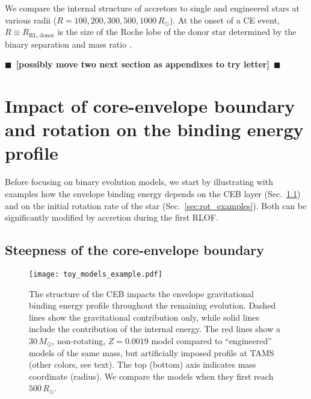 \documentclass[twocolumn,twocolappendix,trackchanges]{aastex63}
\DeclareRobustCommand{\Secref}[1]{Sec.~\ref{#1}}
\newcommand{\todo}[1]{{\large $\blacksquare$~\textbf{\color{red}[#1]}}~$\blacksquare$}
\begin{document}
We compare the internal structure of accretors to single and
engineered stars at various radii
($R=100, 200, 300, 500, 1000\,R_\odot$). At the onset of a CE event,
$R\equiv R_\mathrm{RL, donor}$ is the size of the Roche lobe of the
donor star determined by the binary separation and mass ratio
\citep[e.g.,][]{paczynski:1971, eggleton:83}.%

\todo{possibly move two next section as appendixes to try letter}
\section{Impact of core-envelope boundary and rotation on the binding  energy profile}
\label{sec:intro_res}

Before focusing on binary evolution models, we start by illustrating
with examples how the envelope binding energy depends on the CEB layer
(\Secref{sec:eng_examples}) and on the initial rotation rate of the
star (\Secref{sec:rot_examples}). Both can be significantly modified
by accretion during the first RLOF.

\subsection{Steepness of the core-envelope boundary}
\label{sec:eng_examples}


\begin{figure}[bp]
  \centering
  \texttt{[image: toy\_models\_example.pdf]}
  \caption{The structure of the CEB impacts the envelope gravitational
    binding energy profile throughout the remaining evolution. Dashed
    lines show the gravitational contribution only, while solid lines
    include the contribution of the internal energy. The red lines
    show a $30\,M_\odot$, non-rotating, $Z=0.0019$ model compared to
    ``engineered'' models of the same mass, but artificially imposed
    profile at TAMS (other colors, see text). The top (bottom) axis
    indicates mass coordinate (radius). We compare the models when
    they first reach $500\,R_\odot$.}
  \label{fig:toy_models_example}
\end{figure}
\end{document}
